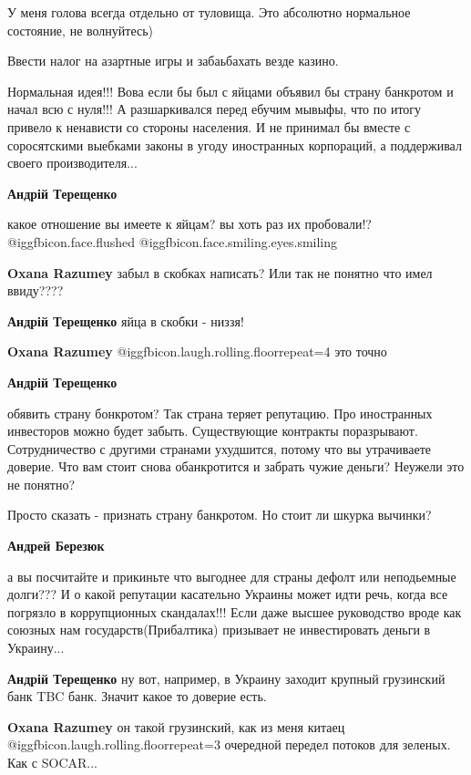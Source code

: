 \begin{itemize}
У меня голова всегда отдельно от туловища. Это абсолютно нормальное состояние, не волнуйтесь)

Ввести налог на азартные игры и забаьбахать везде казино.


Нормальная идея!!! Вова если бы был с яйцами объявил бы страну банкротом и
начал всю с нуля!!! А разшаркивался перед ебучим мывыфы, что по итогу привело к
ненависти со стороны населения. И не принимал бы вместе с соросятскими выебками
законы в угоду иностранных корпораций, а поддерживал своего производителя...

\begin{itemize} %
\textbf{Андрій Терещенко} 

какое отношение вы имеете к яйцам? вы хоть раз их пробовали!?
@igg{fbicon.face.flushed}  @igg{fbicon.face.smiling.eyes.smiling} 

\textbf{Oxana Razumey} забыл в скобках написать? Или так не понятно что имел ввиду????

\textbf{Андрій Терещенко} яйца в скобки - низзя!

\textbf{Oxana Razumey}  @igg{fbicon.laugh.rolling.floor}{repeat=4}  это точно

\textbf{Андрій Терещенко} 

обявить страну бонкротом? Так страна теряет репутацию. Про иностранных
инвесторов можно будет забыть. Существующие контракты поразрывают.
Сотрудничество с другими странами ухудшится, потому что вы утрачиваете доверие.
Что вам стоит снова обанкротится и забрать чужие деньги? Неужели это не
понятно?

Просто сказать - признать страну банкротом. Но стоит ли шкурка вычинки?

\textbf{Андрей Березюк} 

а вы посчитайте и прикиньте что выгоднее для страны дефолт или неподьемные
долги??? И о какой репутации касательно Украины может идти речь, когда все
погрязло в коррупционных скандалах!!! Если даже высшее руководство вроде как
союзных нам государств(Прибалтика) призывает не инвестировать деньги в
Украину...


\textbf{Андрій Терещенко} ну вот, например, в Украину заходит крупный грузинский банк TBC банк. Значит какое то доверие есть.

\textbf{Oxana Razumey} он такой грузинский, как из меня китаец  @igg{fbicon.laugh.rolling.floor}{repeat=3} очередной передел потоков для зеленых. Как с SOCAR...
\end{itemize} %


\end{itemize}
